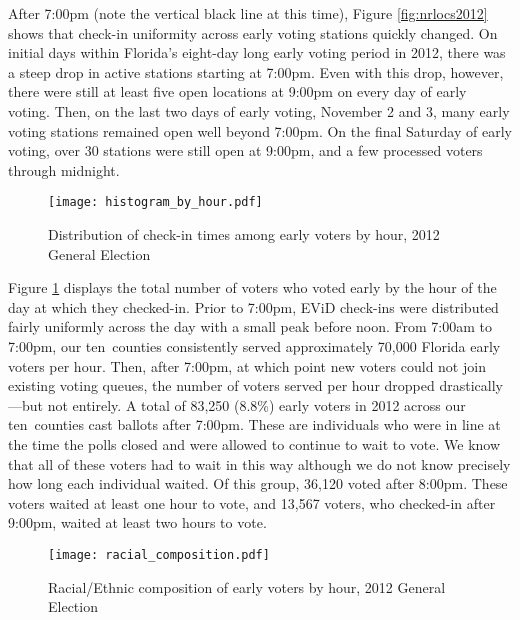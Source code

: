 \documentclass[12pt,titlepage]{article}
\newcommand{\numcounties}{ten}
\begin{document}
After 7:00pm (note the vertical black line at this time), Figure
\ref{fig:nrlocs2012} shows that check-in uniformity across early
voting stations quickly changed.  On initial days within Florida's
eight-day long early voting period in 2012, there was a steep drop in
active stations starting at 7:00pm.  Even with this drop, however,
there were still at least five open locations at 9:00pm on every day
of early voting.  Then, on the last two days of early voting, November
2 and 3, many early voting stations remained open well beyond 7:00pm.
On the final Saturday of early voting, over 30 stations were still
open at 9:00pm, and a few processed voters through midnight.

\begin{figure}[!ht]
\caption{Distribution of check-in times among early voters by hour, 2012 General Election}
  \label{fig:hist2012}
  \centering
    \centering\texttt{[image: histogram\_by\_hour.pdf]}
\end{figure}

Figure \ref{fig:hist2012} displays the total number of voters who
voted early by the hour of the day at which they checked-in. Prior to
7:00pm, EViD check-ins were distributed fairly uniformly across the
day with a small peak before noon.  From 7:00am to 7:00pm, our
\numcounties\ counties consistently served approximately 70,000
Florida early voters per hour. Then, after 7:00pm, at which point new
voters could not join existing voting queues, the number of voters
served per hour dropped drastically---but not entirely.  A total of
83,250 (8.8\%) early voters in 2012 across our \numcounties\ counties
cast ballots after 7:00pm. These are individuals who were in line at
the time the polls closed and were allowed to continue to wait to
vote.  We know that all of these voters had to wait in this way
although we do not know precisely how long each individual waited.  Of
this group, 36,120 voted after 8:00pm.  These voters waited at least
one hour to vote, and 13,567 voters, who checked-in after 9:00pm,
waited at least two hours to vote.




\begin{figure}[!ht]
\caption{Racial/Ethnic composition of early voters by hour, 2012 General Election}
  \label{fig:race2012}
  \centering
    \centering\texttt{[image: racial\_composition.pdf]}
\end{figure}
\end{document}
